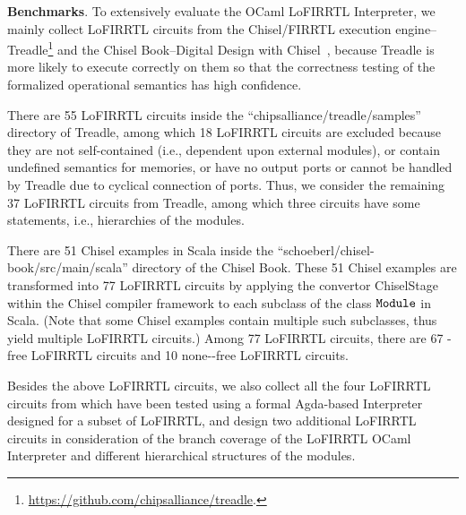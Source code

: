 
\smallskip\noindent
{\bf Benchmarks}. To extensively evaluate the OCaml LoFIRRTL Interpreter,
we mainly collect LoFIRRTL circuits from the Chisel/FIRRTL execution engine--Treadle\footnote{\url{https://github.com/chipsalliance/treadle}.} and the Chisel Book--Digital Design with Chisel~\cite{chisel:book},
because Treadle is more likely to execute correctly on them so that
the correctness testing of the formalized operational semantics has high confidence.

There are 55 LoFIRRTL circuits inside the ``chipsalliance/treadle/samples'' directory
of Treadle, among which 18 LoFIRRTL circuits are excluded because they are not self-contained (i.e., dependent upon external modules),
or contain undefined semantics for memories, or have no output ports or cannot be handled by Treadle due to cyclical connection of ports.
Thus, we consider the remaining 37 LoFIRRTL circuits from Treadle, among which three circuits have some  statements,
i.e., hierarchies of the modules.

There are 51 Chisel examples in Scala inside the ``schoeberl/chisel-book/src/main/scala'' directory of the Chisel Book.
These 51 Chisel examples are transformed into 77 LoFIRRTL circuits by applying the convertor \textsf{ChiselStage} within the Chisel compiler framework
to each subclass of the class $\tt Module$ in Scala. (Note that some Chisel examples contain multiple such subclasses, thus yield multiple LoFIRRTL circuits.)
Among 77 LoFIRRTL circuits, there are 67 -free LoFIRRTL circuits and 10 none--free LoFIRRTL circuits.

Besides the above LoFIRRTL circuits, we also collect all the four LoFIRRTL circuits from
\cite{HarrisonHA21} which have been tested using a formal Agda-based Interpreter designed for a subset of LoFIRRTL,
and design two additional LoFIRRTL circuits in consideration of the branch coverage of the LoFIRRTL OCaml Interpreter and different hierarchical structures of the modules.

